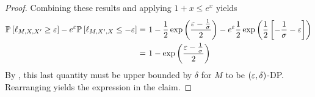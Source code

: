 \begin{proof}
    Combining these results and applying $1+x \leq e^x$ yields
    \begin{align*}
        \mathbb{P}_{}\left[\ell_{M,X,X'} \geq \varepsilon\right] - e^{\varepsilon}\mathbb{P}_{}\left[\ell_{M,X',X} \leq -\varepsilon\right] =&\ 1 - \frac{1}{2}\exp\left(\frac{\varepsilon - \frac{1}{\sigma}}{2}\right) - e^{\varepsilon}\frac{1}{2}\exp\left(\frac{1}{2}\left[-\frac{1}{\sigma} - \varepsilon\right]\right) \\
        =&\ 1 - \exp\left(\frac{\varepsilon - \frac{1}{\sigma}}{2}\right)
    \end{align*}
    By , this last quantity must be upper bounded by $\delta$ for $M$ to be $(\varepsilon, \delta)$-DP. Rearranging yields the expression in the claim.
\end{proof}